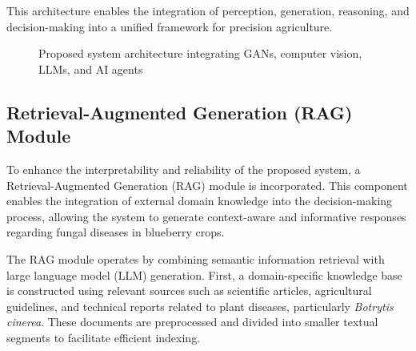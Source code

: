 \documentclass[11pt]{article}
\begin{document}
This architecture enables the integration of perception, generation, reasoning, and decision-making into a unified framework for precision agriculture.

\begin{figure}[h]
\centering
{}
\caption{Proposed system architecture integrating GANs, computer vision, LLMs, and AI agents}
\label{fig:architecture}
\end{figure}

\subsection{Retrieval-Augmented Generation (RAG) Module}
To enhance the interpretability and reliability of the proposed system, a Retrieval-Augmented Generation (RAG) module is incorporated. This component enables the integration of external domain knowledge into the decision-making process, allowing the system to generate context-aware and informative responses regarding fungal diseases in blueberry crops.

The RAG module operates by combining semantic information retrieval with large language model (LLM) generation. First, a domain-specific knowledge base is constructed using relevant sources such as scientific articles, agricultural guidelines, and technical reports related to plant diseases, particularly \textit{Botrytis cinerea}. These documents are preprocessed and divided into smaller textual segments to facilitate efficient indexing.
\end{document}
